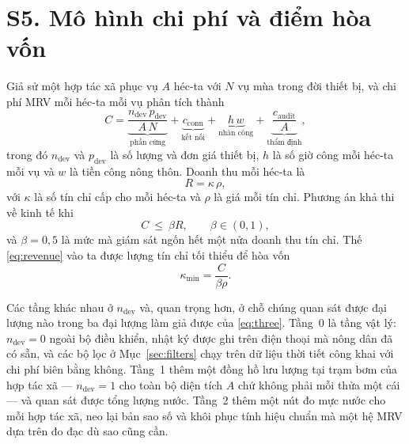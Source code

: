 \section*{S5. Mô hình chi phí và điểm hòa vốn}
\label{sec:cost}

Giả sử một hợp tác xã phục vụ $A$ héc-ta với $N$ vụ mùa trong đời thiết bị, và chi phí
MRV mỗi héc-ta mỗi vụ phân tích thành
\begin{equation}
C=\underbrace{\frac{n_{\mathrm{dev}}\,p_{\mathrm{dev}}}{A\,N}}_{\text{phần cứng}}
+\underbrace{c_{\mathrm{conn}}}_{\text{kết nối}}
+\underbrace{h\,w}_{\text{nhân công}}
+\underbrace{\frac{c_{\mathrm{audit}}}{A}}_{\text{thẩm định}},
\label{eq:cost}
\end{equation}
trong đó $n_{\mathrm{dev}}$ và $p_{\mathrm{dev}}$ là số lượng và đơn giá thiết bị, $h$
là số giờ công mỗi héc-ta mỗi vụ và $w$ là tiền công nông thôn. Doanh thu mỗi héc-ta là
\begin{equation}
R=\kappa\,\rho ,
\label{eq:revenue}
\end{equation}
với $\kappa$ là số tín chỉ cấp cho mỗi héc-ta và $\rho$ là giá mỗi tín chỉ. Phương án
khả thi về kinh tế khi
\begin{equation}
C\ \le\ \beta R ,\qquad \beta\in(0,1),
\label{eq:breakeven}
\end{equation}
và $\beta=0{,}5$ là mức mà giám sát ngốn hết một nửa doanh thu tín chỉ. Thế
\eqref{eq:revenue} vào ta được lượng tín chỉ tối thiểu để hòa vốn
\begin{equation}
\kappa_{\min}=\frac{C}{\beta\rho}.
\label{eq:kappamin}
\end{equation}

Các tầng khác nhau ở $n_{\mathrm{dev}}$ và, quan trọng hơn, ở chỗ chúng quan sát được
đại lượng nào trong ba đại lượng làm giả được của \eqref{eq:three}. Tầng~0 là tầng vật
lý: $n_{\mathrm{dev}}=0$ ngoài bộ điều khiển, nhật ký được ghi trên điện thoại mà nông
dân đã có sẵn, và các bộ lọc ở Mục~\ref{sec:filters} chạy trên dữ liệu thời tiết công
khai với chi phí biên bằng không. Tầng~1 thêm một đồng hồ lưu lượng tại trạm bơm của hợp
tác xã --- $n_{\mathrm{dev}}=1$ cho toàn bộ diện tích $A$ chứ không phải mỗi thửa một
cái --- và quan sát được tổng lượng nước. Tầng~2 thêm một nút đo mực nước cho mỗi hợp
tác xã, neo lại bản sao số và khôi phục tính hiệu chuẩn mà một hệ MRV dựa trên đo đạc
dù sao cũng cần.

